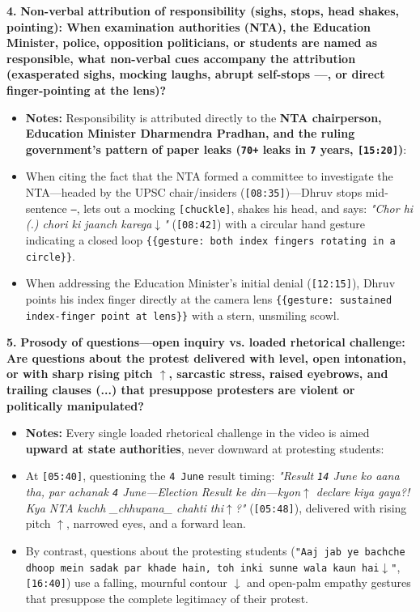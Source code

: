 \documentclass[10pt,a4paper]{article}
\begin{document}
\noindent\textbf{4.} \textbf{Non-verbal attribution of responsibility (sighs, stops, head shakes, pointing): When examination authorities (NTA), the Education Minister, police, opposition politicians, or students are named as responsible, what non-verbal cues accompany the attribution (exasperated sighs, mocking laughs, abrupt self-stops ---, or direct finger-pointing at the lens)?}\par\smallskip
\begin{itemize}
  \item \textbf{Notes:}
Responsibility is attributed directly to the \textbf{NTA chairperson, Education Minister Dharmendra Pradhan, and the ruling government's pattern of paper leaks (\texttt{70+} leaks in \texttt{7} years, \texttt{[15:20]})}:\par\smallskip
  \item When citing the fact that the NTA formed a committee to investigate the NTA---headed by the UPSC chair/insiders (\texttt{[08:35]})---Dhruv stops mid-sentence \texttt{---}, lets out a mocking \texttt{[chuckle]}, shakes his head, and says: \textit{"Chor hi (.) chori ki jaanch karega$\downarrow$"} (\texttt{[08:42]}) with a circular hand gesture indicating a closed loop \texttt{\{\{gesture: both index fingers rotating in a circle\}\}}.
  \item When addressing the Education Minister's initial denial (\texttt{[12:15]}), Dhruv points his index finger directly at the camera lens \texttt{\{\{gesture: sustained index-finger point at lens\}\}} with a stern, unsmiling scowl.
\end{itemize}

\noindent\textbf{5.} \textbf{Prosody of questions---open inquiry vs. loaded rhetorical challenge: Are questions about the protest delivered with level, open intonation, or with sharp rising pitch $\uparrow$, sarcastic stress, raised eyebrows, and trailing clauses (...) that presuppose protesters are violent or politically manipulated?}\par\smallskip
\begin{itemize}
  \item \textbf{Notes:}
Every single loaded rhetorical challenge in the video is aimed \textbf{upward at state authorities}, never downward at protesting students:\par\smallskip
  \item At \texttt{[05:40]}, questioning the \texttt{4 June} result timing: \textit{"Result \texttt{14} June ko aana tha, par achanak \texttt{4} June---Election Result ke din---kyon$\uparrow$ declare kiya gaya?! Kya NTA kuchh \_chhupana\_ chahti thi$\uparrow$?"} (\texttt{[05:48]}), delivered with rising pitch \texttt{$\uparrow$}, narrowed eyes, and a forward lean.
  \item By contrast, questions about the protesting students (\texttt{"Aaj jab ye bachche dhoop mein sadak par khade hain, toh inki sunne wala kaun hai$\downarrow$"}, \texttt{[16:40]}) use a falling, mournful contour \texttt{$\downarrow$} and open-palm empathy gestures that presuppose the complete legitimacy of their protest.
\end{itemize}
\end{document}
